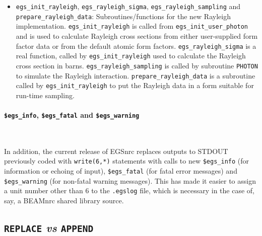 \begin{itemize}
\item
{}
{\tt egs\_init\_rayleigh}, {\tt egs\_rayleigh\_sigma},
{\tt egs\_rayleigh\_sampling} and {\tt prepare\_rayleigh\_data}:
Subroutines/functions for the new Rayleigh implementation.
{\tt egs\_init\_rayleigh} is called from {\tt egs\_init\_user\_photon}
and is used to calculate Rayleigh cross sections from either user-supplied
form factor data or from the default atomic form factors.
{\tt egs\_rayleigh\_sigma} is a real function, called by
{\tt egs\_init\_rayleigh} used to calculate the Rayleigh cross
section in barns.  {\tt egs\_rayleigh\_sampling} is called by
subroutine {\tt PHOTON} to simulate the Rayleigh interaction.
{\tt prepare\_rayleigh\_data} is a subroutine called by
{\tt egs\_init\_rayleigh} to put the Rayleigh data in a form
suitable for run-time sampling.

\end{itemize}

\paragraph{{\tt \$egs\_info}, {\tt \$egs\_fatal} and {\tt \$egs\_warning}}\hfill\\

In addition, the current release of EGSnrc replaces outputs to
STDOUT previously coded with {\tt write(6,*)} statements with
calls to new {\tt \$egs\_info} (for information or echoing of input),
{\tt \$egs\_fatal} (for fatal error messages) and
{\tt \$egs\_warning} (for non-fatal warning messages).  This has made it
easier to assign a unit number other than 6 to the {\tt .egslog} file, which
is necessary in the case of, say, a BEAMnrc shared library source.

\subsection{{\tt REPLACE} {\it vs} {\tt APPEND}}
\label{append}

